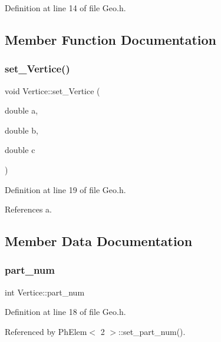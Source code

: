Definition at line 14 of file Geo.\+h.



\subsection{Member Function Documentation}
\mbox{\label{structVertice_a33f7f57b5f0867fe0bc39d3e43337679}} 
\subsubsection{\texorpdfstring{set\+\_\+\+Vertice()}{set\_Vertice()}}
{\footnotesize\ttfamily void Vertice\+::set\+\_\+\+Vertice (\begin{DoxyParamCaption}\item[{double}]{a,  }\item[{double}]{b,  }\item[{double}]{c }\end{DoxyParamCaption})\hspace{0.3cm}{\ttfamily [inline]}}



Definition at line 19 of file Geo.\+h.



References a.



\subsection{Member Data Documentation}
\mbox{\label{structVertice_aa2d0f5b9ce2f3225e00ef8f243d6a4ac}} 
\subsubsection{\texorpdfstring{part\+\_\+num}{part\_num}}
{\footnotesize\ttfamily int Vertice\+::part\+\_\+num}



Definition at line 18 of file Geo.\+h.



Referenced by Ph\+Elem$<$ 2 $>$\+::set\+\_\+part\+\_\+num().

\mbox{\label{structVertice_ac0fd70610f8efe191b3b9763c79c8ad1}} 
